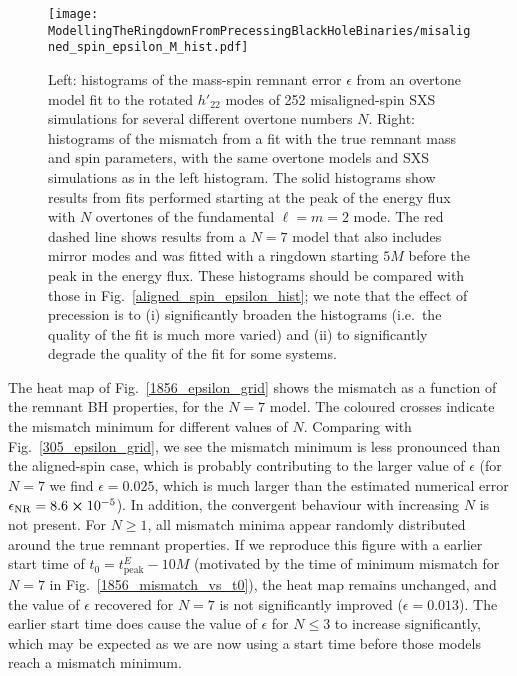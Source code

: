 \begin{figure}[t]
    \centering
    \texttt{[image: ModellingTheRingdownFromPrecessingBlackHoleBinaries/misaligned\_spin\_epsilon\_M\_hist.pdf]}
    \caption[Remnant error and mismatches for fits to misaligned-spin SXS simulations using an overtone model]{Left: histograms of the mass-spin remnant error $\epsilon$ from an overtone model fit to the rotated $h'_{22}$ modes of 252 misaligned-spin SXS simulations for several different overtone numbers $N$. 
    Right: histograms of the mismatch from a fit with the true remnant mass and spin parameters, with the same overtone models and SXS simulations as in the left histogram.
    The solid histograms show results from fits performed starting at the peak of the energy flux with $N$ overtones of the fundamental $\ell = m = 2$ mode.
    The red dashed line shows results from a $N=7$ model that also includes mirror modes and was fitted with a ringdown starting $5M$ before the peak in the energy flux.
    These histograms should be compared with those in Fig.~\ref{aligned_spin_epsilon_hist}; we note that the effect of precession is to (i) significantly broaden the histograms (i.e.\ the quality of the fit is much more varied) and (ii) to significantly degrade the quality of the fit for some systems.}
    \label{misaligned_spin_epsilon_hist}
\end{figure}

The heat map of Fig.~\ref{1856_epsilon_grid} shows the mismatch as a function of the remnant BH properties, for the $N=7$ model.
The coloured crosses indicate the mismatch minimum for different values of $N$. 
Comparing with Fig.~\ref{305_epsilon_grid}, we see the mismatch minimum is less pronounced than the aligned-spin case, which is probably contributing to the larger value of $\epsilon$ (for $N=7$ we find $\epsilon = 0.025$, which is much larger than the estimated numerical error $\epsilon_{\mathrm{NR}} = 8.6 \cross 10^{-5}$). 
In addition, the convergent behaviour with increasing $N$ is not present. For $N \geq 1$, all mismatch minima appear randomly distributed around the true remnant properties.
If we reproduce this figure with a earlier start time of $t_0 = t_{\mathrm{peak}}^{\dot{E}} - 10M$ (motivated by the time of minimum mismatch for $N=7$ in Fig.~\ref{1856_mismatch_vs_t0}), the heat map remains unchanged, and the value of $\epsilon$ recovered for $N=7$ is not significantly improved ($\epsilon = 0.013$). The earlier start time does cause the value of $\epsilon$ for $N \leq 3$ to increase significantly, which may be expected as we are now using a start time before those models reach a mismatch minimum. 

